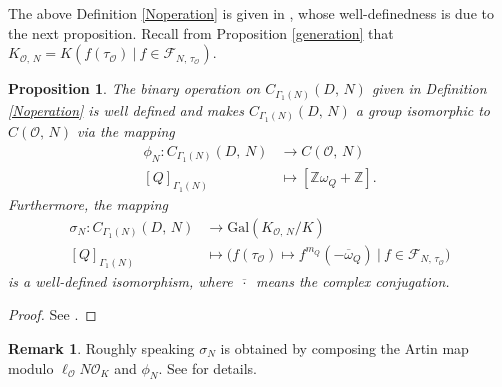 \documentclass[reqno,11pt]{article}
\theoremstyle{plain} %
\newtheorem{proposition}[theorem]{\indent\sc Proposition}
\theoremstyle{definition} %
\newtheorem{remark}[theorem]{\indent\sc Remark}
\begin{document}
The above Definition \ref{Noperation} is given in \cite[Definition 5.7]{J-K-S-Y}, 
whose well-definedness is due to the next proposition. 
Recall from Proposition \ref{generation} that
$K_{\mathcal{O},\,N}=K(f(\tau_\mathcal{O})~|~f\in\mathcal{F}_{N,\,\tau_\mathcal{O}})$.

\begin{proposition}\label{isomorphism}
The binary operation on $C_{\Gamma_1(N)}(D,\,N)$
given in Definition \ref{Noperation}
is well defined and makes $C_{\Gamma_1(N)}(D,\,N)$
a group isomorphic to $C(\mathcal{O},\,N)$ via the mapping\begin{align*}
\phi_N:C_{\Gamma_1(N)}(D,\,N)&\rightarrow C(\mathcal{O},\,N)\\
[Q]_{\Gamma_1(N)}&\mapsto
[\mathbb{Z}\omega_Q+\mathbb{Z}]. 
\end{align*}
Furthermore, the mapping 
\begin{align*}
\sigma_N:C_{\Gamma_1(N)}(D,\,N)&\rightarrow\mathrm{Gal}(K_{\mathcal{O},\,N}/K)\\
[Q]_{\Gamma_1(N)}&\mapsto
\bigg(f(\tau_\mathcal{O})\mapsto f^{m_Q}(-\overline{\omega}_Q)~|~
f\in\mathcal{F}_{N,\,\tau_\mathcal{O}}\bigg)
\end{align*}
is a well-defined isomorphism,
where $\overline{\,\cdot\,}$ means
the complex conjugation.  
\end{proposition}
\begin{proof}
See \cite[Theorems 9.4 and 12.3]{J-K-S-Y}.
\end{proof}

\begin{remark}
Roughly speaking 
$\sigma_N$ is obtained by composing 
the Artin map modulo $\ell_\mathcal{O}N\mathcal{O}_K$
and $\phi_N$. 
See \cite[$\S$11--12]{J-K-S-Y} for details.  
\end{remark}
\end{document}
